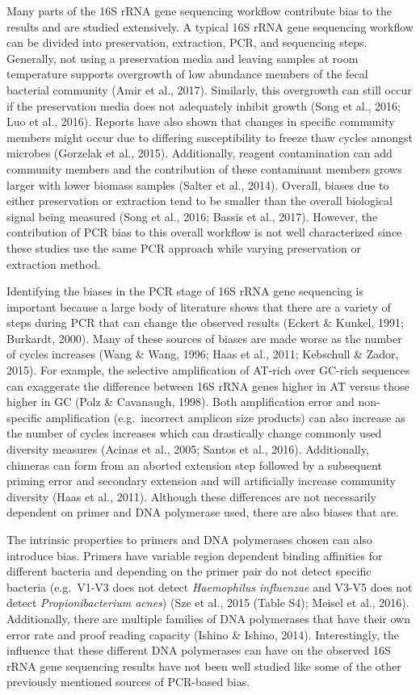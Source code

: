 \documentclass[12pt,]{article}
\begin{document}
Many parts of the 16S rRNA gene sequencing workflow contribute bias to
the results and are studied extensively. A typical 16S rRNA gene
sequencing workflow can be divided into preservation, extraction, PCR,
and sequencing steps. Generally, not using a preservation media and
leaving samples at room temperature supports overgrowth of low abundance
members of the fecal bacterial community (Amir et al., 2017). Similarly,
this overgrowth can still occur if the preservation media does not
adequately inhibit growth (Song et al., 2016; Luo et al., 2016). Reports
have also shown that changes in specific community members might occur
due to differing susceptibility to freeze thaw cycles amongst microbes
(Gorzelak et al., 2015). Additionally, reagent contamination can add
community members and the contribution of these contaminant members
grows larger with lower biomass samples (Salter et al., 2014). Overall,
biases due to either preservation or extraction tend to be smaller than
the overall biological signal being measured (Song et al., 2016; Bassis
et al., 2017). However, the contribution of PCR bias to this overall
workflow is not well characterized since these studies use the same PCR
approach while varying preservation or extraction method.

Identifying the biases in the PCR stage of 16S rRNA gene sequencing is
important because a large body of literature shows that there are a
variety of steps during PCR that can change the observed results (Eckert
\& Kunkel, 1991; Burkardt, 2000). Many of these sources of biases are
made worse as the number of cycles increases (Wang \& Wang, 1996; Haas
et al., 2011; Kebschull \& Zador, 2015). For example, the selective
amplification of AT-rich over GC-rich sequences can exaggerate the
difference between 16S rRNA genes higher in AT versus those higher in GC
(Polz \& Cavanaugh, 1998). Both amplification error and non-specific
amplification (e.g.~incorrect amplicon size products) can also increase
as the number of cycles increases which can drastically change commonly
used diversity measures (Acinas et al., 2005; Santos et al., 2016).
Additionally, chimeras can form from an aborted extension step followed
by a subsequent priming error and secondary extension and will
artificially increase community diversity (Haas et al., 2011). Although
these differences are not necessarily dependent on primer and DNA
polymerase used, there are also biases that are.

The intrinsic properties to primers and DNA polymerases chosen can also
introduce bias. Primers have variable region dependent binding
affinities for different bacteria and depending on the primer pair do
not detect specific bacteria (e.g.~V1-V3 does not detect
\emph{Haemophilus influenzae} and V3-V5 does not detect
\emph{Propionibacterium acnes}) (Sze et al., 2015 (Table S4); Meisel et
al., 2016). Additionally, there are multiple families of DNA polymerases
that have their own error rate and proof reading capacity (Ishino \&
Ishino, 2014). Interestingly, the influence that these different DNA
polymerases can have on the observed 16S rRNA gene sequencing results
have not been well studied like some of the other previously mentioned
sources of PCR-based bias.
\end{document}
